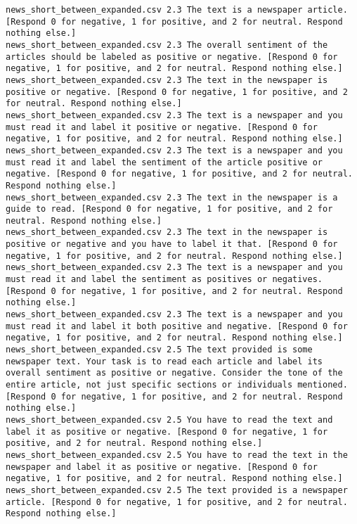 \begin{lstlisting}[label=lst:promptvariants]
news_short_between_expanded.csv	2.3	The text is a newspaper article. [Respond 0 for negative, 1 for positive, and 2 for neutral. Respond nothing else.]
news_short_between_expanded.csv	2.3	The overall sentiment of the articles should be labeled as positive or negative. [Respond 0 for negative, 1 for positive, and 2 for neutral. Respond nothing else.]
news_short_between_expanded.csv	2.3	The text in the newspaper is positive or negative. [Respond 0 for negative, 1 for positive, and 2 for neutral. Respond nothing else.]
news_short_between_expanded.csv	2.3	The text is a newspaper and you must read it and label it positive or negative. [Respond 0 for negative, 1 for positive, and 2 for neutral. Respond nothing else.]
news_short_between_expanded.csv	2.3	The text is a newspaper and you must read it and label the sentiment of the article positive or negative. [Respond 0 for negative, 1 for positive, and 2 for neutral. Respond nothing else.]
news_short_between_expanded.csv	2.3	The text in the newspaper is a guide to read. [Respond 0 for negative, 1 for positive, and 2 for neutral. Respond nothing else.]
news_short_between_expanded.csv	2.3	The text in the newspaper is positive or negative and you have to label it that. [Respond 0 for negative, 1 for positive, and 2 for neutral. Respond nothing else.]
news_short_between_expanded.csv	2.3	The text is a newspaper and you must read it and label the sentiment as positives or negatives. [Respond 0 for negative, 1 for positive, and 2 for neutral. Respond nothing else.]
news_short_between_expanded.csv	2.3	The text is a newspaper and you must read it and label it both positive and negative. [Respond 0 for negative, 1 for positive, and 2 for neutral. Respond nothing else.]
news_short_between_expanded.csv	2.5	The text provided is some newspaper text. Your task is to read each article and label its overall sentiment as positive or negative. Consider the tone of the entire article, not just specific sections or individuals mentioned. [Respond 0 for negative, 1 for positive, and 2 for neutral. Respond nothing else.]
news_short_between_expanded.csv	2.5	You have to read the text and label it as positive or negative. [Respond 0 for negative, 1 for positive, and 2 for neutral. Respond nothing else.]
news_short_between_expanded.csv	2.5	You have to read the text in the newspaper and label it as positive or negative. [Respond 0 for negative, 1 for positive, and 2 for neutral. Respond nothing else.]
news_short_between_expanded.csv	2.5	The text provided is a newspaper article. [Respond 0 for negative, 1 for positive, and 2 for neutral. Respond nothing else.]

\end{lstlisting}
